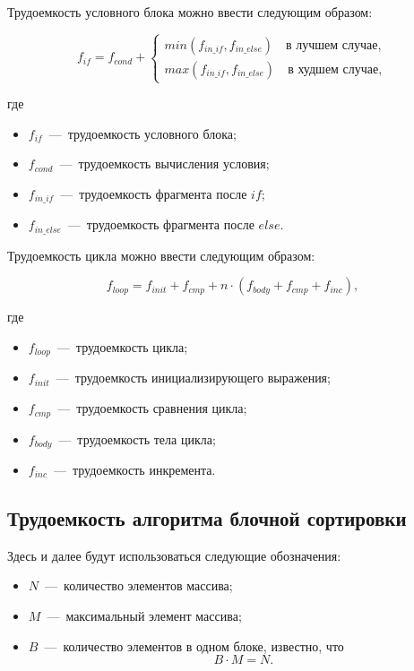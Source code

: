 Трудоемкость условного блока можно ввести следующим образом:

\begin{equation}
	f_{if} = f_{cond} + \begin{cases}
		min(f_{in\_if}, f_{in\_else}) \quad \text{в лучшем случае}, \\
		max(f_{in\_if}, f_{in\_else}) \quad \text{в худшем случае},
	\end{cases}
\end{equation}

где

\begin{itemize}
	\item $f_{if}$~---~трудоемкость условного блока;
	\item $f_{cond}$~---~трудоемкость вычисления условия;
	\item $f_{in\_if}$~---~трудоемкость фрагмента после $if$;
	\item $f_{in\_else}$~---~трудоемкость фрагмента после $else$.
\end{itemize}

Трудоемкость цикла можно ввести следующим образом:


\begin{equation}
	f_{loop} = f_{init} + f_{cmp} + n \cdot (f_{body} + f_{cmp} + f_{inc}),
\end{equation}

где

\begin{itemize}
	\item $f_{loop}$~---~трудоемкость цикла;
	\item $f_{init}$~---~трудоемкость инициализирующего выражения;
	\item $f_{cmp}$~---~трудоемкость сравнения цикла;
	\item $f_{body}$~---~трудоемкость тела цикла;
	\item $f_{inc}$~---~трудоемкость инкремента.
\end{itemize}

\subsection{Трудоемкость алгоритма блочной сортировки}
Здесь и далее будут использоваться следующие обозначения:

\begin{itemize}
	\item $N$~---~количество элементов массива;
	\item $M$~---~максимальный элемент массива;
	\item $B$~---~количество элементов в одном блоке, известно, что
	\begin{equation}
		B \cdot M = N.
	\end{equation}
\end{itemize}

